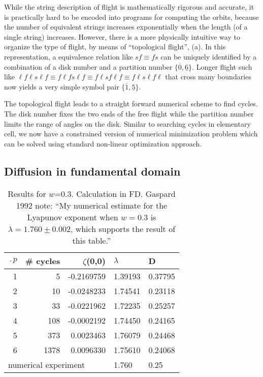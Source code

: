 \documentclass[aps,pre,
                showpacs,
                twocolumn,
                groupedaddress,
                floatfix]{revtex4-1}
\begin{document}
While the string description of flight is mathematically rigorous and accurate, it is practically hard to be encoded into programs for computing the orbits, because the number of equivalent strings increases exponentially when the length (of a single string) increases. However, there is a more physically intuitive way to organize the type of flight, by means of ``topological flight'',  (a). In this representation, a equivalence relation like $sf\equiv fs$ can be uniquely identified by a combination of a disk number and a partition number $\{\overline{0},\underline{6}\}$. Longer flight such like $\ell f \ell s \ell f \equiv  f \ell f s \ell f \equiv f \ell s f \ell f \equiv f \ell s \ell f \ell$ that cross many boundaries now yields a very simple symbol pair $\{\overline{1},\underline{5}\}$. 

The topological flight leads to a straight forward numerical scheme to find cycles. The disk number fixes the two ends of the free flight while the partition number limits the range of angles on the disk. Similar to searching cycles in elementary cell, we now have a constrained version of numerical minimization problem which can be solved using standard non-linear optimization approach. 


\subsection{Diffusion in fundamental domain}
\begin{table}[htbp]
\hfill
{}
\begin{tabular}{|r|r|r|l|l|}
\hline
$\period{p}$ & \# cycles & $\zeta$(0,0) & $\lambda$ & D \\ \hline\hline
1      & 5      & -0.2169759 & 1.39193 & 0.37795 \\
2      & 10     & -0.0248233 & 1.74541 & 0.23118\\
3      & 33     & -0.0221962 & 1.72235 & 0.25257\\
4      & 108    & -0.0002192 & 1.74450 & 0.24165\\
5      & 373    &  0.0023463 & 1.76079 & 0.24468\\
6      & 1378   &  0.0096330 & 1.75610 & 0.24068\\ \hline\hline
\multicolumn{3}{|l|}{numerical experiment}
                           & 1.760 & 0.25
\\ \hline
\end{tabular}

\caption{\label{TCELL2}
  Results for $w$=0.3. Calculation in FD. Gaspard 1992
  note: ``My numerical estimate for the Lyapunov exponent when $w=0.3$ is
  $\lambda = 1.760 \pm 0.002$, which supports the result of this table.''
}
\end{table}
\end{document}
